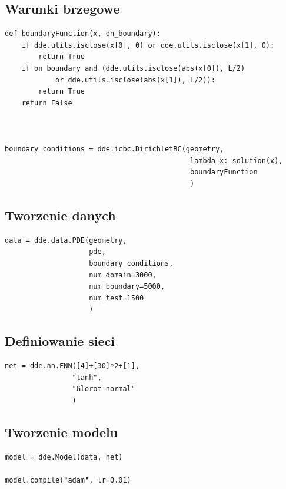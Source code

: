 \documentclass{article}
\begin{document}
	\subsection*{Warunki brzegowe}

	\begin{lstlisting}
def boundaryFunction(x, on_boundary):
    if dde.utils.isclose(x[0], 0) or dde.utils.isclose(x[1], 0):
        return True
    if on_boundary and (dde.utils.isclose(abs(x[0]), L/2) 
			or dde.utils.isclose(abs(x[1]), L/2)):
        return True
    return False



boundary_conditions = dde.icbc.DirichletBC(geometry, 
                                            lambda x: solution(x), 
                                            boundaryFunction
                                            )
	\end{lstlisting}

	\subsection*{Tworzenie danych}

	\begin{lstlisting}
data = dde.data.PDE(geometry, 
                    pde, 
                    boundary_conditions, 
                    num_domain=3000,
                    num_boundary=5000,
                    num_test=1500
                    )
	\end{lstlisting}

	\subsection*{Definiowanie sieci}

	\begin{lstlisting}
net = dde.nn.FNN([4]+[30]*2+[1],
                "tanh",
                "Glorot normal"
                )

	\end{lstlisting}


	\subsection*{Tworzenie modelu}

	\begin{lstlisting}
model = dde.Model(data, net)

model.compile("adam", lr=0.01)
	\end{lstlisting}
\end{document}
